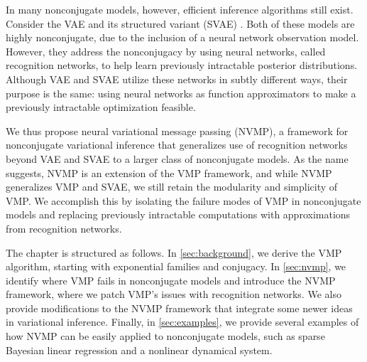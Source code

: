 In many nonconjugate models,
however, efficient inference algorithms still exist.
Consider the VAE
and its structured variant (SVAE) \cite{svae}.
Both of these models
are highly nonconjugate, due to the inclusion
of a neural network observation model.
However, they address the nonconjugacy
by using neural networks, called recognition networks,
to help learn previously intractable posterior distributions.
Although VAE and SVAE utilize these networks
in subtly different ways, their purpose is the same: using
neural networks as function approximators
to make a previously intractable optimization feasible.

We thus propose neural variational message passing (NVMP),
a framework for nonconjugate variational inference
that generalizes use of recognition networks beyond
VAE and SVAE to a larger class
of nonconjugate models. 
As the name suggests,
NVMP is an extension of the
VMP framework, and while NVMP
generalizes VMP and SVAE, 
we still retain the modularity and
simplicity of VMP. 
We accomplish this by 
isolating the failure modes of VMP in nonconjugate models
and replacing previously intractable
computations with approximations
from recognition networks.

The chapter is structured as follows. In \autoref{sec:background},
we derive the VMP algorithm, starting
with exponential families and conjugacy.
In \autoref{sec:nvmp},
we identify where VMP fails in nonconjugate
models and introduce the NVMP framework,
where we patch VMP's issues
with recognition networks.
We also provide
modifications to the NVMP framework
that integrate some newer ideas
in variational inference. 
Finally, in \autoref{sec:examples},
we provide several examples of how NVMP can
be easily applied to nonconjugate models, such
as sparse Bayesian linear regression
and a nonlinear dynamical system.


